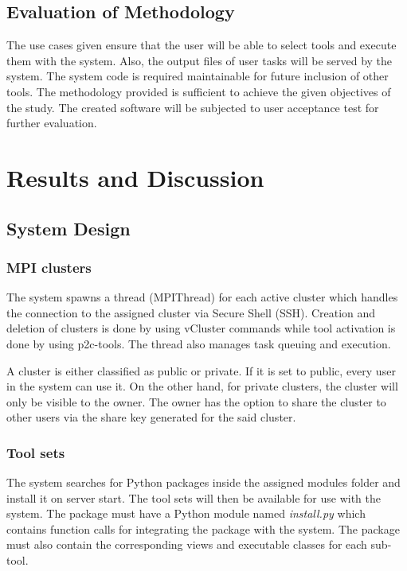    \subsection {Evaluation of Methodology}
    	The use cases given ensure that the user will be able to select tools and execute them with the system. Also, the output files of user tasks will be served by the system. The system code is required maintainable for future inclusion of other tools.  
        The methodology provided is sufficient to achieve the given objectives of the study. The created software will be subjected to user acceptance test for further evaluation. 

\section{Results and Discussion}
	\subsection{System Design}
		\subsubsection{MPI clusters} 
		The system spawns a thread (MPIThread) for each active cluster which handles the connection to the assigned cluster via Secure Shell (SSH). Creation and deletion of clusters is done by using vCluster commands while tool activation is done by using p2c-tools. The thread also manages task queuing and execution.
		
		A cluster is either classified as public or private. If it is set to public, every user in the system can use it. On the other hand, for private clusters, the cluster will only be visible to the owner. The owner has the option to share the cluster to other users via the share key generated for the said cluster. 		

		\subsubsection{Tool sets} 
		The system searches for Python packages inside the assigned modules folder and install it on server start. The tool sets will then be available for use with the system. The package must have a Python module named \emph{install.py} which contains function calls for integrating the package with the system. The package must also contain the corresponding views and executable classes for each sub-tool.  

